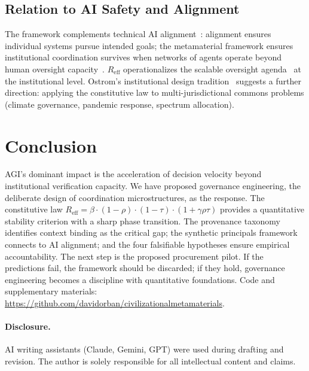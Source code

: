\documentclass[runningheads]{llncs}
\begin{document}
\subsection{Relation to AI Safety and Alignment}

The framework complements technical AI alignment~\cite{amodei2016concrete,gabriel2020artificial}: alignment ensures individual systems pursue intended goals; the metamaterial framework ensures institutional coordination survives when networks of agents operate beyond human oversight capacity~\cite{hendrycks2022xrisk}. $R_{\mathrm{eff}}$ operationalizes the scalable oversight agenda~\cite{bowman2022measuring} at the institutional level. Ostrom's institutional design tradition~\cite{ostrom1990governing} suggests a further direction: applying the constitutive law to multi-jurisdictional commons problems (climate governance, pandemic response, spectrum allocation).


\section{Conclusion}
\label{sec:conclusion}

AGI's dominant impact is the acceleration of decision velocity beyond institutional verification capacity. We have proposed governance engineering, the deliberate design of coordination microstructures, as the response. The constitutive law $R_{\mathrm{eff}} = \beta \cdot (1-\rho) \cdot (1-\tau) \cdot (1+\gamma \rho \tau)$ provides a quantitative stability criterion with a sharp phase transition. The provenance taxonomy identifies context binding as the critical gap; the synthetic principals framework connects to AI alignment; and the four falsifiable hypotheses ensure empirical accountability. The next step is the proposed procurement pilot. If the predictions fail, the framework should be discarded; if they hold, governance engineering becomes a discipline with quantitative foundations. Code and supplementary materials: \url{https://github.com/davidorban/civilizationalmetamaterials}.

\paragraph{Disclosure.} AI writing assistants (Claude, Gemini, GPT) were used during drafting and revision. The author is solely responsible for all intellectual content and claims.



\end{document}
